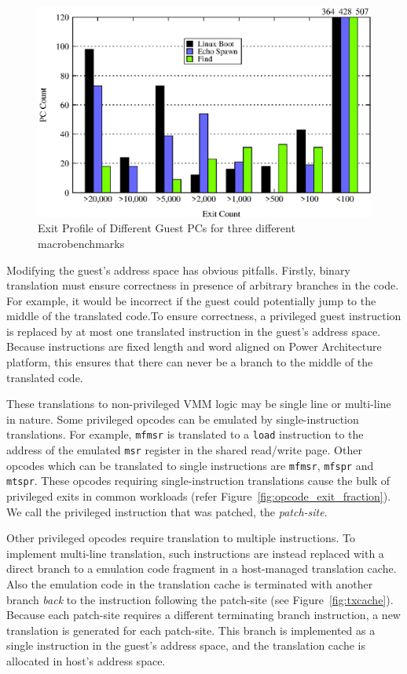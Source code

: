 \begin{figure}[!tb]
\centering
\includegraphics[scale=0.5]{pc_count.eps}
\caption{\label{fig:pc_profile}Exit Profile of Different Guest PCs for three different macrobenchmarks}
\end{figure}

Modifying the guest's address space has obvious pitfalls. Firstly, binary translation must ensure correctness in presence of arbitrary branches in the code. For example, it would be incorrect if the guest could potentially jump to the middle of the translated code.To ensure correctness, a privileged guest instruction is replaced by at most one translated instruction in the guest's address space. Because instructions are fixed length and word aligned on Power Architecture platform, this ensures that there can never be a branch to the middle of the translated code.

These translations to non-privileged VMM logic may be single line  or multi-line in nature. Some privileged opcodes can be emulated by single-instruction translations. For example, {\tt mfmsr} is translated to a {\tt load} instruction to the address of the emulated {\tt msr} register in the shared read/write page. Other opcodes which can be translated to single instructions are {\tt mfmsr}, {\tt mfspr} and {\tt mtspr}. These opcodes requiring single-instruction translations cause the bulk of privileged exits in common workloads (refer Figure~\ref {fig:opcode_exit_fraction}). We call the privileged instruction that was patched, the {\em patch-site}.

Other privileged opcodes require translation to multiple instructions. To implement multi-line translation, such instructions are instead replaced with a direct branch to a emulation code fragment in a host-managed translation cache. Also the emulation code in the translation cache is terminated with another branch {\em back} to the instruction following the patch-site (see Figure~\ref{fig:txcache}). Because each patch-site requires a different terminating branch instruction, a new translation is generated for each patch-site. This branch is  implemented as a single instruction in the guest’s address space, and the translation cache is allocated in host’s address space.

